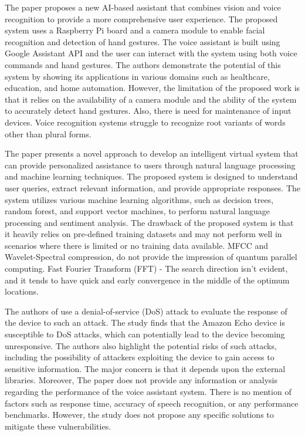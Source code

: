 \documentclass[conference]{IEEEtran}
\begin{document}
\par The paper \cite{dinesh2022artificial} proposes a new AI-based assistant that combines vision and voice recognition to provide a more comprehensive user experience. The proposed system uses a Raspberry Pi board and a camera module to enable facial recognition and detection of hand gestures. The voice assistant is built using Google Assistant API and the user can interact with the system using both voice commands and hand gestures. The authors demonstrate the potential of this system by showing its applications in various domains such as healthcare, education, and home automation. However, the limitation of the proposed work is that it relies on the availability of a camera module and the ability of the system to accurately detect hand gestures. Also, there is need for maintenance of input devices. Voice recognition systems struggle to recognize root variants of words other than plural forms. 

\par The paper \cite{sati2022intelligent} presents a novel approach to develop an intelligent virtual system that can provide personalized assistance to users through natural language processing and machine learning techniques. The proposed system is designed to understand user queries, extract relevant information, and provide appropriate responses. The system utilizes various machine learning algorithms, such as decision trees, random forest, and support vector machines, to perform natural language processing and sentiment analysis. The drawback of the proposed system is that it heavily relies on pre-defined training datasets and may not perform well in scenarios where there is limited or no training data available. MFCC and Wavelet-Spectral compression, do not provide the impression of quantum parallel computing. Fast Fourier Transform (FFT) - The search direction isn't evident, and it tends to have quick and early convergence in the middle of the optimum locations.

\par The authors of \cite{overstreet2019penetration} use a denial-of-service (DoS) attack to evaluate the response of the device to such an attack. The study finds that the Amazon Echo device is susceptible to DoS attacks, which can potentially lead to the device becoming unresponsive. The authors also highlight the potential risks of such attacks, including the possibility of attackers exploiting the device to gain access to sensitive information. The major concern is that it depends upon the external libraries. Moreover, The paper does not provide any information or analysis regarding the performance of the voice assistant system. There is no mention of factors such as response time, accuracy of speech recognition, or any performance benchmarks. However, the study does not propose any specific solutions to mitigate these vulnerabilities.
\end{document}
